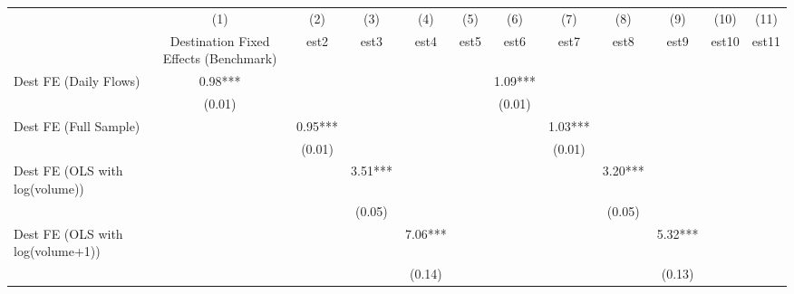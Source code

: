 {
\def\sym#1{\ifmmode^{#1}\else\(^{#1}\)\fi}
\begin{tabular}{l*{11}{c}}
\toprule
            &\multicolumn{1}{c}{(1)}&\multicolumn{1}{c}{(2)}&\multicolumn{1}{c}{(3)}&\multicolumn{1}{c}{(4)}&\multicolumn{1}{c}{(5)}&\multicolumn{1}{c}{(6)}&\multicolumn{1}{c}{(7)}&\multicolumn{1}{c}{(8)}&\multicolumn{1}{c}{(9)}&\multicolumn{1}{c}{(10)}&\multicolumn{1}{c}{(11)}\\
            &\multicolumn{1}{c}{Destination Fixed Effects (Benchmark)}&\multicolumn{1}{c}{est2}&\multicolumn{1}{c}{est3}&\multicolumn{1}{c}{est4}&\multicolumn{1}{c}{est5}&\multicolumn{1}{c}{est6}&\multicolumn{1}{c}{est7}&\multicolumn{1}{c}{est8}&\multicolumn{1}{c}{est9}&\multicolumn{1}{c}{est10}&\multicolumn{1}{c}{est11}\\
\addlinespace\addlinespace
Dest FE (Daily Flows)&        0.98***&               &               &               &               &        1.09***&               &               &               &               &               \\
            &      (0.01)   &               &               &               &               &      (0.01)   &               &               &               &               &               \\
\addlinespace
Dest FE (Full Sample)&               &        0.95***&               &               &               &               &        1.03***&               &               &               &               \\
            &               &      (0.01)   &               &               &               &               &      (0.01)   &               &               &               &               \\
\addlinespace
Dest FE (OLS with log(volume))&               &               &        3.51***&               &               &               &               &        3.20***&               &               &               \\
            &               &               &      (0.05)   &               &               &               &               &      (0.05)   &               &               &               \\
\addlinespace
Dest FE (OLS with log(volume+1))&               &               &               &        7.06***&               &               &               &               &        5.32***&               &               \\
            &               &               &               &      (0.14)   &               &               &               &               &      (0.13)   &               &               \\

\end{tabular}}
